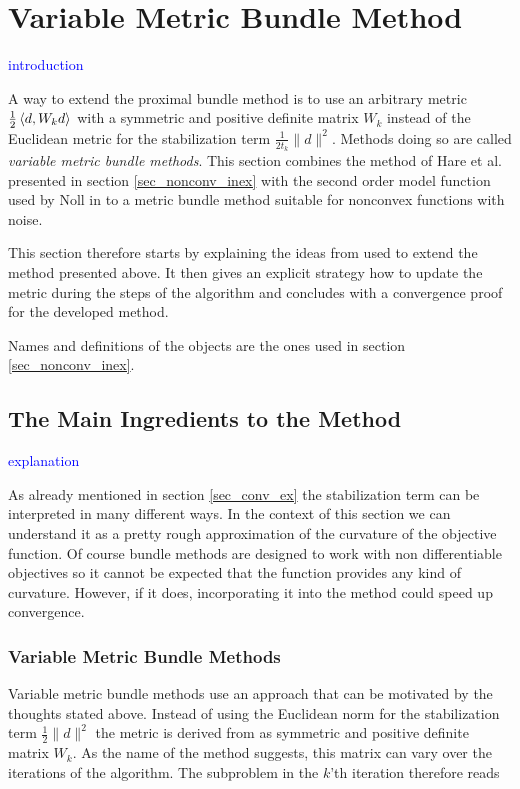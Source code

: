 \section{Variable Metric Bundle Method}
\label{variable_metric}

\textcolor{blue}{introduction}

A way to extend the proximal bundle method is to use an arbitrary metric \(\frac{1}{2}\left\langle d,W_kd \right\rangle\) with a symmetric and positive definite matrix \(W_k\) instead of the Euclidean metric for the stabilization term \(\frac{1}{2t_k}\|d\|^2\). Methods doing so are called \emph{variable metric bundle methods}.
This section combines the method of Hare et al. presented in section \ref{sec_nonconv_inex} with the second order model function used by Noll in \cite{Noll2013} to a metric bundle method suitable for nonconvex functions with noise.

This section therefore starts by explaining the ideas from \cite{Noll2013} used to extend the method presented above. It then gives an explicit strategy how to update the metric during the steps of the algorithm and concludes with a convergence proof for the developed method.

Names and definitions of the objects are the ones used in section \ref{sec_nonconv_inex}.

\subsection{The Main Ingredients to the Method}
\textcolor{blue}{explanation}

As already mentioned in section \ref{sec_conv_ex} the stabilization term can be interpreted in many different ways. In the context of this section we can understand it as a pretty rough approximation of the curvature of the objective function.
Of course bundle methods are designed to work with non differentiable objectives so it cannot be expected that the function provides any kind of curvature. However, if it does, incorporating it into the method could speed up convergence.

\subsubsection{Variable Metric Bundle Methods}

Variable metric bundle methods use an approach that can be motivated by the thoughts stated above.
Instead of using the Euclidean norm for the stabilization term \(\frac{1}{2}\|d\|^2 \) the metric is derived from as symmetric and positive definite matrix \(W_k\). As the name of the method suggests, this matrix can vary over the iterations of the algorithm. The subproblem in the \(k\)'th iteration therefore reads 

